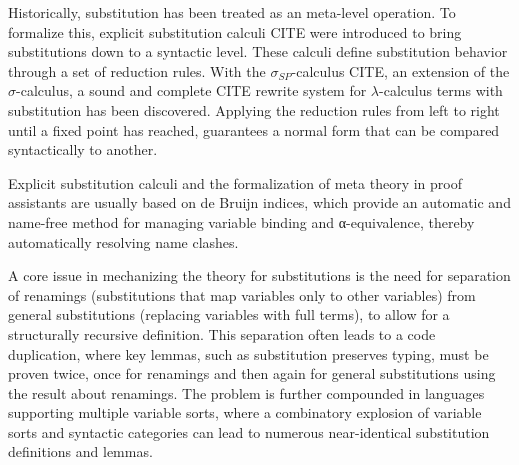 \documentclass[screen,nonacm]{acmart}
\begin{document}
Historically, substitution has been treated as an meta-level operation. To
formalize this, explicit substitution calculi CITE were introduced to bring
substitutions down to a syntactic level. These calculi define substitution
behavior through a set of reduction rules. With the $σ_{SP}$-calculus CITE, an
extension of the $σ$-calculus, a sound and complete CITE rewrite system for
$λ$-calculus terms with substitution has been discovered. Applying the
reduction rules from left to right until a fixed point has reached, guarantees
a normal form that can be compared syntactically to another.

Explicit substitution calculi and the formalization of meta theory in proof
assistants are usually based on de Bruijn indices, which provide an automatic
and name-free method for managing variable binding and α-equivalence, thereby
automatically resolving name clashes.

A core issue in mechanizing the theory for substitutions is the need for
separation of renamings (substitutions that map variables only to other
variables) from general substitutions (replacing variables with full terms), to
allow for a structurally recursive definition. This separation often leads to a
code duplication, where key lemmas, such as substitution preserves typing, must
be proven twice, once for renamings and then again for general substitutions
using the result about renamings. The problem is further compounded in
languages supporting multiple variable sorts, where a combinatory explosion of
variable sorts and syntactic categories can lead to numerous near-identical
substitution definitions and lemmas.
\end{document}
